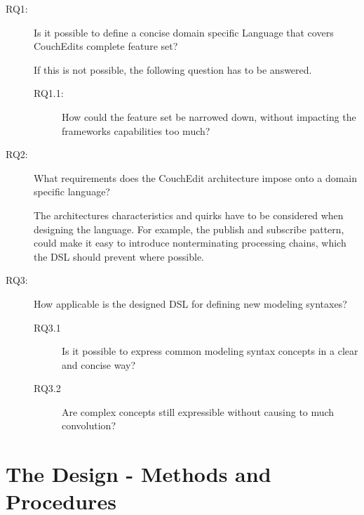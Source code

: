 \documentclass[10pt,a4paper,oneside]{scrartcl}
\newcommand\hint[2]{
\ifthenelse{\boolean{showhints}}{
\begin{center}
\colorbox{black!10}{
\begin{minipage}{.963\textwidth}
#2\hfill\textbf{#1}
\end{minipage}
}\end{center}}{}
}
\begin{document}
\begin{description}
  \item[RQ1:] Is it possible to define a concise domain specific Language that covers CouchEdits complete feature set?

        If this is not possible, the following question has to be answered.
        \begin{description}
          \item[RQ1.1:] How could the feature set be narrowed down, without impacting the frameworks capabilities too much?
        \end{description}

  \item[RQ2:] What requirements does the CouchEdit architecture impose onto a domain specific language?

        The architectures characteristics and quirks have to be considered when designing the language. For example, the publish and subscribe pattern, could make it easy to introduce nonterminating processing chains, which the DSL should prevent where possible.

  \item[RQ3:] How applicable is the designed DSL for defining new modeling syntaxes?

        \begin{description}
          \item[RQ3.1] Is it possible to express common modeling syntax concepts in a clear and concise way?
          \item[RQ3.2] Are complex concepts still expressible without causing to much convolution?
        \end{description}
\end{description}

\section{The Design - Methods and Procedures}
\label{sec:approach}

\end{document}
